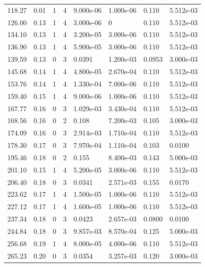 \documentclass[preview]{standalone}
\begin{document}
{{\begin{tabular}{L{1.2cm}C{1.2cm} C{0.3cm}C{0.5cm} C{1.4cm}C{1.4cm} C{1.4cm}C{1.4cm}}
  118.27  &  0.01  & 1     &  4 &  9.000e-06  & 1.000e-06  & 0.110 &  5.512e-03   \\ 
  126.00  &  0.13  & 1     &  4 &  3.000e-06  & 0  & 0.110 &  5.512e-03   \\ 
  134.10  &  0.13  & 1     &  4 &  3.200e-05  & 3.000e-06  & 0.110 &  5.512e-03   \\ 
  136.90  &  0.13  & 1     &  4 &  5.900e-05  & 3.000e-06  & 0.110 &  5.512e-03   \\ 
  139.59  &  0.13  & 0     &  3 &  0.0391  & 1.200e-03  & 0.0953 &  3.000e-03   \\ 
  145.68  &  0.14  & 1     &  4 &  4.800e-05  & 2.670e-04  & 0.110 &  5.512e-03   \\ 
  153.76  &  0.14  & 1     &  4 &  1.330e-04  & 7.000e-06  & 0.110 &  5.512e-03   \\ 
  159.40  &  0.15  & 1     &  4 &  9.000e-06  & 1.000e-06  & 0.110 &  5.512e-03   \\ 
  167.77  &  0.16  & 0     &  3 &  1.029e-03  & 3.430e-04  & 0.110 &  5.512e-03   \\ 
  168.56  &  0.16  & 0     &  2 &  0.108  & 7.200e-03  & 0.105 &  3.000e-03   \\ 
  174.09  &  0.16  & 0     &  3 &  2.914e-03  & 1.710e-04  & 0.110 &  5.512e-03   \\ 
  178.30  &  0.17  & 0     &  3 &  7.970e-04  & 1.110e-04  & 0.103 &  0.0100   \\ 
  195.46  &  0.18  & 0     &  2 &  0.155  & 8.400e-03  & 0.143 &  5.000e-03   \\ 
  201.10  &  0.15  & 1     &  4 &  5.200e-05  & 3.000e-06  & 0.110 &  5.512e-03   \\ 
  206.40  &  0.18  & 0     &  3 &  0.0341  & 2.571e-03  & 0.155 &  0.0170   \\ 
  223.62  &  0.17  & 1     &  4 &  1.500e-05  & 1.000e-06  & 0.110 &  5.512e-03   \\ 
  227.12  &  0.17  & 1     &  4 &  1.600e-05  & 1.000e-06  & 0.110 &  5.512e-03   \\ 
  237.34  &  0.18  & 0     &  3 &  0.0423  & 2.657e-03  & 0.0800 &  0.0100   \\ 
  244.84  &  0.18  & 0     &  3 &  9.857e-03  & 8.570e-04  & 0.125 &  5.000e-03   \\ 
  256.68  &  0.19  & 1     &  4 &  8.000e-05  & 4.000e-06  & 0.110 &  5.512e-03   \\ 
  265.23  &  0.20  & 0     &  3 &  0.0354  & 3.257e-03  & 0.120 &  3.000e-03   \\ 

\end{tabular}}}
\end{document}
